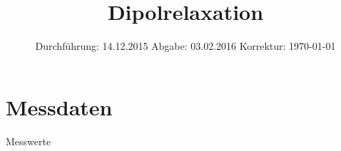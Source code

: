 

\subject{V48}
\title{Dipolrelaxation}
\date{
  Durchführung: 14.12.2015
  \hspace{3em}
  Abgabe: 03.02.2016
  \hspace{3em}
  Korrektur: \today
}



\maketitle
\thispagestyle{empty}
\tableofcontents
\newpage



% 


\printbibliography

\appendix

\newpage
\section{Messdaten}
\begin{table}
  \caption{Messwerte}\label{tab:data}
  \hfill%
  \hfill%
  \hfill%
  \hfill%
\end{table}


